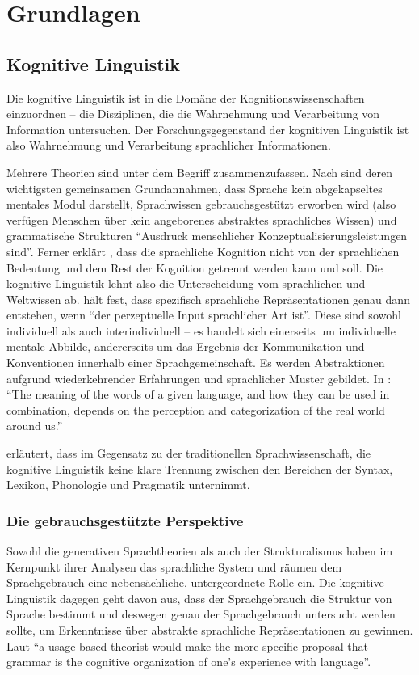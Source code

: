 \section{Grundlagen}

\subsection{Kognitive Linguistik}

Die kognitive Linguistik ist in die Domäne der Kognitionswissenschaften einzuordnen -- die Disziplinen, die die Wahrnehmung und Verarbeitung von Information untersuchen.
Der Forschungsgegenstand der kognitiven Linguistik ist also Wahrnehmung und Verarbeitung sprachlicher Informationen.

Mehrere Theorien sind unter dem Begriff zusammenzufassen.
Nach \cite{Ziem13} sind deren wichtigsten gemeinsamen Grundannahmen, dass Sprache kein abgekapseltes mentales Modul darstellt,
Sprachwissen gebrauchsgestützt erworben wird (also verfügen Menschen über kein angeborenes abstraktes sprachliches Wissen)
und grammatische Strukturen ``Ausdruck menschlicher Konzeptualisierungsleistungen sind''.
Ferner erklärt \cite{Ellis08}, dass die sprachliche Kognition nicht von der sprachlichen Bedeutung und dem Rest der Kognition getrennt werden kann und soll.
Die kognitive Linguistik lehnt also die Unterscheidung vom sprachlichen und Weltwissen ab.
\cite{Ziem08} hält fest, dass spezifisch sprachliche Repräsentationen genau dann entstehen, wenn ``der perzeptuelle Input sprachlicher Art ist''.
Diese sind sowohl individuell als auch interindividuell -- es handelt sich einerseits um individuelle mentale Abbilde, andererseits um das Ergebnis der Kommunikation und Konventionen innerhalb einer Sprachgemeinschaft.
Es werden Abstraktionen aufgrund wiederkehrender Erfahrungen und sprachlicher Muster gebildet.
In \cite{Ellis08}: ``The meaning of the words of a given language, and how they can be used in combination, depends on the perception and categorization of the real world around us.''

\cite{Ellis08} erläutert, dass im Gegensatz zu der traditionellen Sprachwissenschaft, die kognitive Linguistik keine klare Trennung zwischen den Bereichen der Syntax, Lexikon, Phonologie und Pragmatik unternimmt.

\subsubsection{Die gebrauchsgestützte Perspektive}
Sowohl die generativen Sprachtheorien als auch der Strukturalismus haben im Kernpunkt ihrer Analysen das sprachliche System und räumen dem Sprachgebrauch eine nebensächliche, untergeordnete Rolle ein.
Die kognitive Linguistik dagegen geht davon aus, dass der Sprachgebrauch die Struktur von Sprache bestimmt und deswegen genau der Sprachgebrauch untersucht werden sollte, um Erkenntnisse über abstrakte sprachliche Repräsentationen zu gewinnen.
Laut \cite{Bybee06} ``a usage-based theorist would make the more specific proposal that grammar is the cognitive organization of one’s experience with language''.

